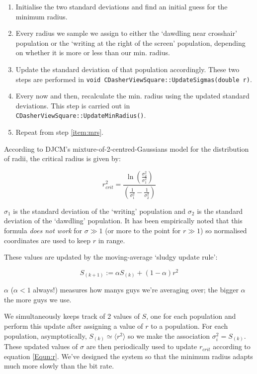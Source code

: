 \documentclass[a4paper,11pt,notitlepage]{article}
\begin{document}
\begin{enumerate}
\item Initialise the two standard deviations and find an initial guess
for the minimum radius.
\item\label{item:mrs} Every radius we sample we assign to either the
`dawdling near crosshair' population or the `writing at the right of
the screen' population, depending on whether it is more or less than
our min. radius.
\item Update the standard deviation of that population
accordingly. These two steps are performed in \texttt{void
CDasherViewSquare::UpdateSigmas(double r)}.
\item Every now and then, recalculate the min. radius using the
updated standard deviations. This step is carried out in
\texttt{CDasherViewSquare::UpdateMinRadius()}.
\item Repeat from step \ref{item:mrs}.
\end{enumerate}

According to DJCM's mixture-of-2-centred-Gaussians model for the
distribution of radii, the critical radius is given by:

\begin{equation}\label{Equn:r}
r_{crit}^2 = \frac{\ln\left(\frac{\sigma_2^2}{\sigma_1^2}\right)}{\left(\frac{1}{\sigma_1^2} - \frac{1}{\sigma_2^2}\right)}
\end{equation}

$\sigma_1$ is the standard deviation of the `writing' population and
$\sigma_2$ is the standard deviation of the `dawdling' population. It
has been empirically noted that this formula \emph{does not work} for
$\sigma \gg 1$ (or more to the point for $r \gg 1$) so normalised
coordinates are used to keep $r$ in range.

These values are updated by the moving-average `sludgy
update rule':

\begin{equation}
S_{(k+1)} := \alpha S_{(k)} + (1 - \alpha)r^2
\end{equation}

$\alpha$ ($\alpha < 1$ always!) measures how manys guys we're
averaging over; the bigger $\alpha$ the more guys we use.

We simultaneously keeps track of 2 values of $S$, one for each
population and perform this update after assigning a value of $r$ to a
population. For each population, asymptotically, $S_{(k)} \simeq
\langle r^2 \rangle$ so we make the association $\sigma_i^2 =
S_{(k)}$. These updated values of $\sigma$ are then periodically used
to update $r_{crit}$ according to equation \ref{Equn:r}. We've
designed the system so that the minimum radius adapts much more slowly
than the bit rate.
\end{document}
